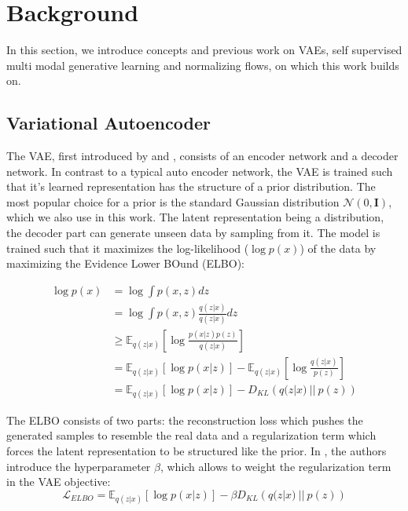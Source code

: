 \section{Background}
In this section, we introduce concepts and previous work on VAEs, self supervised multi modal generative learning and normalizing flows, on which this work builds on.

\subsection{Variational Autoencoder}
The VAE, first introduced by \cite{kingma_auto-encoding_2014} and \cite{rezende_stochastic_2014}, consists of an encoder network and a decoder network.
In contrast to a typical auto encoder network, the VAE is trained such that it's learned representation has the structure of a prior distribution.
The most popular choice for a prior is the standard Gaussian distribution $\mathcal{N}(0,\textbf{I})$, which we also use in this work.
The latent representation being a distribution, the decoder part can generate unseen data by sampling from it.
The model is trained such that it maximizes the log-likelihood ($\log p(x)$) of the data by maximizing the Evidence Lower BOund (ELBO):

\begin{equation}
    \label{vaeelbo}
    \begin{split}
        \log p(x) &= \log \int p(x,z) dz\\
        &=  \log \int p(x,z) \frac{q(z|x)}{q(z|x)}dz\\
        &\geq \mathbb{E} _{q(z|x)}[\log \frac{p(x|z)p(z)}{q(z|x)}]\\
        &= \mathbb{E} _{q(z|x)}[\log p(x|z)] - \mathbb{E} _{q(z|x)}[\log \frac{q(z|x)}{p(z)}]\\
        &= \mathbb{E} _{q(z|x)}[\log p(x|z)] - D_{KL}\left( q(z|x)\ ||\ p(z)\right)
    \end{split}
\end{equation}

The ELBO consists of two parts: the reconstruction loss which pushes the generated samples to resemble the real data and a regularization term which forces the latent representation to be structured like the prior.
In \cite{beta_vae}, the authors introduce the hyperparameter $\beta$, which allows to weight the regularization term in the VAE objective:
\begin{equation}
    \mathcal{L}_{ELBO} = \mathbb{E} _{q(z|x)}[\log p(x|z)] - \beta D_{KL}\left( q(z|x)\ ||\ p(z)\right)
\end{equation}

